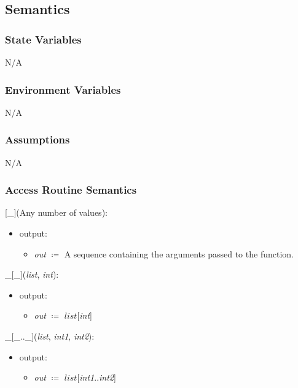 \documentclass[12pt, titlepage]{article}
\begin{document}
\subsection{Semantics}

\subsubsection{State Variables}

N/A

\subsubsection{Environment Variables}

N/A

\subsubsection{Assumptions}

N/A

\subsubsection{Access Routine Semantics}

[\_](Any number of values):
\begin{itemize}
	\item output: 
	\begin{itemize}
		\item[] \textit{out} $\coloneqq$ A sequence containing the arguments 
		passed to the function.
	\end{itemize}
\end{itemize}

\noindent \_[\_](\textit{list}, \textit{int}):
\begin{itemize}
	\item output: 
	\begin{itemize}
		\item[] \textit{out} $\coloneqq$ $list$[\textit{int}]	
	\end{itemize}
\end{itemize}

\noindent \_[\_..\_](\textit{list}, \textit{int1}, \textit{int2}):
\begin{itemize}
	\item output: 
	\begin{itemize}
		\item[] \textit{out} $\coloneqq$ $list$[\textit{int1}..\textit{int2}]
	\end{itemize}
\end{itemize}
\end{document}
